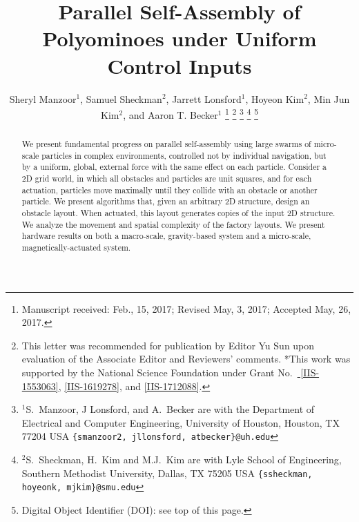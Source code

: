 \documentclass[letterpaper, 10 pt, conference]{ieeeconf}
\begin{document}
\title{Parallel Self-Assembly of Polyominoes under Uniform Control Inputs}
\author{Sheryl Manzoor$^{1}$, Samuel Sheckman$^{2}$, Jarrett Lonsford$^{1}$, Hoyeon Kim$^{2}$, Min Jun Kim$^{2}$, and Aaron T. Becker$^{1}$%
\thanks{Manuscript received: Feb., 15, 2017; Revised May, 3, 2017; Accepted May, 26, 2017.}%
\thanks{This letter was recommended for publication by Editor Yu Sun upon evaluation of the Associate Editor and Reviewers' comments. *This work was supported by the National Science Foundation under Grant No.\ \href{http://nsf.gov/awardsearch/showAward?AWD_ID=1553063}{ [IIS-1553063]}, \href{http://nsf.gov/awardsearch/showAward?AWD_ID=1619278}{[IIS-1619278]}, and \href{https://nsf.gov/awardsearch/showAward?AWD_ID=1712088}{[IIS-1712088]}.}%
\thanks{$^{1}$S.~Manzoor, J Lonsford, and  A.~Becker are with the Department of Electrical and Computer Engineering,  University of Houston, Houston, TX 77204 USA        {\tt\small  \{smanzoor2, jllonsford, atbecker\}@uh.edu}}%
\thanks{$^{2} $S.~Sheckman, H.~Kim and M.J.~Kim are with Lyle School of Engineering,   Southern Methodist University, Dallas, TX 75205 USA        {\tt\small  \{ssheckman, hoyeonk, mjkim\}@smu.edu}}%
\thanks{Digital Object Identifier (DOI): see top of this page.}
}
\maketitle


\begin{abstract} 
We present fundamental progress on parallel self-assembly using large swarms of micro-scale particles in complex environments, controlled not by individual navigation, but by a uniform, global, external force with the same effect on each particle.
Consider a 2D grid world, in which all obstacles and particles are unit squares,
and for each actuation, particles move maximally until they collide with an obstacle or another particle. 
We present algorithms that, given an arbitrary 2D structure, design an obstacle layout.
 When actuated, this layout generates copies of the input 2D structure.
We analyze the movement and spatial complexity of the factory layouts. 
We present hardware results on both a macro-scale, gravity-based system and a micro-scale, magnetically-actuated system.
\end{abstract}












\end{document}
